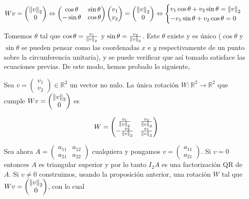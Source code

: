 \[Wv = \begin{pmatrix}\left\lVert v\right\rVert_2 \\ 0\end{pmatrix} \Leftrightarrow 
\begin{pmatrix}
\cos \theta & \sin \theta \\
-\sin \theta & \cos \theta
\end{pmatrix} \begin{pmatrix}v_1 \\ v_2\end{pmatrix} = 
\begin{pmatrix}\left\lVert v\right\rVert_2 \\ 0\end{pmatrix} \Leftrightarrow 
\begin{cases}
v_1 \cos \theta  + v_2 \sin \theta  = \left\lVert v\right\rVert_2 \\
-v_1 \sin \theta  + v_2 \cos \theta  = 0
\end{cases}\] 

Tomemos $\theta$ tal que $\cos \theta = \frac{v_1}{\left\lVert v\right\rVert_2}$ y  $\sin \theta = \frac{v_2}{\left\lVert v\right\rVert_2}$. Este $\theta$ existe y es único ($\cos \theta$ y $\sin \theta$ se pueden pensar como las coordenadas $x$ e $y$ respectivamente de un punto sobre la circunferencia unitaria), y se puede verificar que así tomado satisface las ecuaciones previas. De este modo, hemos probado lo siguiente,

\begin{propo}
Sea $v = \begin{pmatrix}v_1 \\ v_2 \end{pmatrix} \in \mathbb{R}^2$ un vector no nulo. La única rotación $W : \mathbb{R}^2 \to \mathbb{R}^2$ que cumple $Wv = \begin{pmatrix}\left\lVert v\right\rVert_2 \\ 0 \end{pmatrix}$ es

\[W = \begin{pmatrix}
\frac{v_1}{\left\lVert v\right\rVert_2} & \frac{v_2}{\left\lVert v\right\rVert_2}\\
-\frac{v_2}{\left\lVert v\right\rVert_2} & \frac{v_1}{\left\lVert v\right\rVert_2}
\end{pmatrix}\]
\end{propo}

Sea ahora $A = \begin{pmatrix}
a_{11} & a_{12}\\
a_{21} & a_{22}
\end{pmatrix}$ cualquiera y pongamos $v = \begin{pmatrix}a_{11} \\ a_{21}\end{pmatrix}$. Si $v = 0$ entonces $A$ es triangular superior y por lo tanto $I_2 A$ es una factorización QR de $A$. Si $v \neq 0$ construimos, usando la proposición anterior, una rotación $W$ tal que $Wv = \begin{pmatrix}\left\lVert v\right\rVert_2 \\ 0\end{pmatrix}$, con lo cual 

